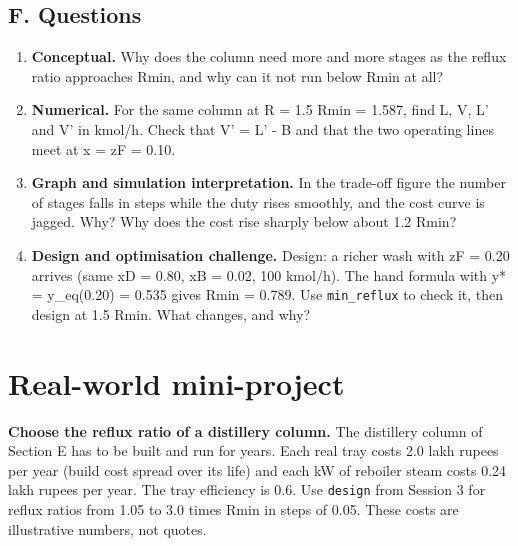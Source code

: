 \documentclass[11pt,a4paper]{article}
\begin{document}
\subsection*{F. Questions}
\begin{enumerate}[nosep]
\item \textbf{Conceptual.} Why does the column need more and more stages as the reflux ratio approaches Rmin, and why can it not run below Rmin at all?
\item \textbf{Numerical.} For the same column at R = 1.5 Rmin = 1.587, find L, V, L' and V' in kmol/h. Check that V' = L' - B and that the two operating lines meet at x = zF = 0.10.
\item \textbf{Graph and simulation interpretation.} In the trade-off figure the number of stages falls in steps while the duty rises smoothly, and the cost curve is jagged. Why? Why does the cost rise sharply below about 1.2 Rmin?
\item \textbf{Design and optimisation challenge.} Design: a richer wash with zF = 0.20 arrives (same xD = 0.80, xB = 0.02, 100 kmol/h). The hand formula with y* = y\_eq(0.20) = 0.535 gives Rmin = 0.789. Use \texttt{min\_reflux} to check it, then design at 1.5 Rmin. What changes, and why?
\end{enumerate}

\section{Real-world mini-project}
\textbf{Choose the reflux ratio of a distillery column.} The distillery column of Section E has to be built and run for years. Each real tray costs 2.0 lakh rupees per year (build cost spread over its life) and each kW of reboiler steam costs 0.24 lakh rupees per year. The tray efficiency is 0.6. Use \texttt{design} from Session 3 for reflux ratios from 1.05 to 3.0 times Rmin in steps of 0.05. These costs are illustrative numbers, not quotes.
\end{document}
